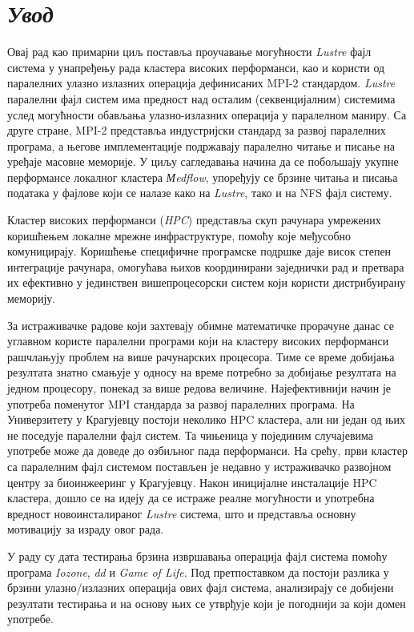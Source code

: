 \chapter{ \textit{Увод} }
Овај рад као примарни циљ поставља проучавање могућности \textit{Lustre} фајл система у унапређењу рада кластера високих перформанси, као и користи од паралелних улазно излазних операција дефинисаних \gls{MPI}-2 стандардом.
\textit{Lustre} паралелни фајл систем има предност над осталим (секвенцијалним) системима услед могућности обављања улазно-излазних операција у паралелном маниру. Са друге стране, MPI-2 представља индустријски стандард за развој паралелних програма, а његове имплементације подржавају паралелно читање и писање на уређаје масовне меморије. У циљу сагледавања начина да се побољшају укупне перформансе локалног кластера \textit{Мedflow}, упоређују се брзине читања и писања података у фајлове који се налазе како на \textit{Lustre}, тако и на NFS  фајл систему.

Кластер високих перформанси (\textit{\gls{HPC}}) представља скуп рачунара умрежених коришћењем локалне мрежне инфраструктуре, помоћу које међусобно комуницирају. Коришћење специфичне програмске подршке даје висок степен интеграције рачунара, омогућава њихов координирани заједнички рад и претвара их ефективно у јединствен вишепроцесорски систем који користи дистрибуирану меморију.

За истраживачке радове који захтевају обимне математичке прорачуне данас се углавном користе паралелни програми који на кластеру високих перформанси рашчлањују проблем на више рачунарских процесора. Тиме се време добијања резултата знатно смањује у односу на време потребно за добијање резултата на једном процесору, понекад за више редова величине. Најефективнији начин је употреба поменутог MPI стандарда за развој паралелних програма. На Универзитету у Крагујевцу постоји неколико HPC кластера, али ни један од њих не поседује паралелни фајл систем. Та чињеница у појединим случајевима употребе може да доведе до озбиљног пада перформанси. На срећу, први кластер са паралелним фајл системом постављен је недавно у истраживачко развојном центру за биоинжееринг у Крагујевцу. Након иницијалне инсталације HPC кластера, дошло се на идеју да се истраже реалне могућности и употребна вредност новоинсталираног \textit{Lustre} система, што и представља основну мотивацију за израду овог рада.
 
У раду су дата тестирања брзина извршавања операција фајл система помоћу програма \textit{Iozone}, \textit{dd} и \textit{Game of Life}. Под претпоставком да постоји разлика у брзини улазно/излазних операција ових фајл система, анализирају се добијени резултати тестирања и на основу њих се утврђује који је погоднији за који домен употребе.

\newpage
